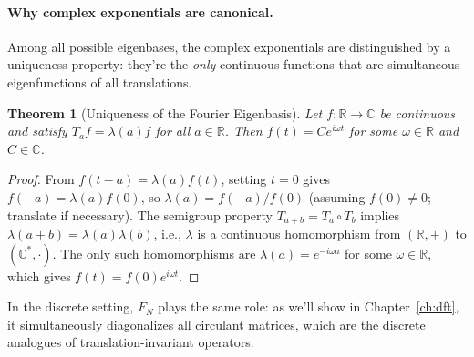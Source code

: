 \documentclass[12pt,a4paper]{report}
\theoremstyle{thms}
\newtheorem{theorem}{Theorem}[section]
\theoremstyle{defns}
\begin{document}
\paragraph{Why complex exponentials are canonical.} Among all possible eigenbases, the complex exponentials are distinguished by a uniqueness property: they're the \textit{only} continuous functions that are simultaneous eigenfunctions of all translations.

\begin{theorem}[Uniqueness of the Fourier Eigenbasis]
    Let $f: \mathbb{R} \to \mathbb{C}$ be continuous and satisfy $T_a f = \lambda(a) f$ for all $a \in \mathbb{R}$. Then $f(t) = Ce^{i\omega t}$ for some $\omega \in \mathbb{R}$ and $C \in \mathbb{C}$.
\end{theorem}

\begin{proof}
    From $f(t - a) = \lambda(a)f(t)$, setting $t = 0$ gives $f(-a) = \lambda(a)f(0)$, so $\lambda(a) = f(-a)/f(0)$ (assuming $f(0) \neq 0$; translate if necessary). The semigroup property $T_{a+b} = T_a \circ T_b$ implies $\lambda(a + b) = \lambda(a)\lambda(b)$, i.e., $\lambda$ is a continuous homomorphism from $(\mathbb{R}, +)$ to $(\mathbb{C}^*, \cdot)$. The only such homomorphisms are $\lambda(a) = e^{-i\omega a}$ for some $\omega \in \mathbb{R}$, which gives $f(t) = f(0)e^{i\omega t}$.
\end{proof}

In the discrete setting, $F_N$ plays the same role: as we'll show in Chapter~\ref{ch:dft}, it simultaneously diagonalizes all circulant matrices, which are the discrete analogues of translation-invariant operators.
\end{document}
